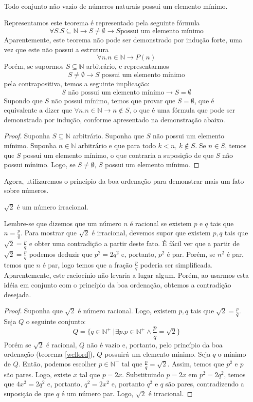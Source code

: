 \begin{Theorem}\label{wellord}
Todo conjunto não vazio de números naturais possui um elemento mínimo.
\end{Theorem}
Representamos este teorema é representado pela seguinte fórmula
\[
\forall S. S\subseteq \mathbb{N} \to S \neq \emptyset \to S\text{
  possui um elemento mínimo}
\]
Aparentemente, este teorema não pode ser demonstrado por indução
forte, uma vez que este não possui a estrutura
\[
\forall n. n\in\mathbb{N} \to P(n)
\]
Porém, se supormos $S\subseteq \mathbb{N}$ arbitrário, e
representarmos
\[S \neq \emptyset \to S\text{ possui um elemento mínimo}\]
pela contrapositiva, temos a seguinte implicação:
\[S\text{ não possui um elemento mínimo} \to S = \emptyset\]
Supondo que $S$ não possui mínimo, temos que provar que $S =
\emptyset$, que é equivalente a dizer que $\forall n. n\in\mathbb{N}
\to n \not\in S$, o que é uma fórmula que pode ser demonstrada por
indução, conforme apresentado na demonstração abaixo.
\begin{proof}
Suponha $S\subseteq\mathbb{N}$ arbitrário. Suponha que $S$ não possui
um elemento mínimo. Suponha $n\in\mathbb{N}$ arbitrário e que para
todo $k < n$, $k \not\in S$. Se $n \in S$, temos que $S$ possui um
elemento mínimo, o que contraria a suposição de que $S$ não possui
mínimo. Logo, se $S \neq \emptyset$, $S$ possui um elemento mínimo.
\end{proof}
Agora, utilizaremos o princípio da boa ordenação para demonstrar mais
um fato sobre números.
\begin{Theorem}
$\sqrt{2}$ é um número irracional.
\end{Theorem}
Lembre-se que dizemos que um número $n$ é racional se existem $p$ e
$q$ tais que $n = \frac{p}{q}$. Para mostrar que $\sqrt{2}$ é
irracional, devemos supor que existem $p,q$ tais que $\sqrt{2} =
\frac{p}{q}$ e obter uma contradição a partir deste fato. É fácil ver
que a partir de $\sqrt{2} =\frac{p}{q}$ podemos deduzir que $p^2 =
2q^2$ e, portanto, $p^2$ é par. Porém, se $n^2$ é par, temos que $n$ é
par, logo temos que a fração $\frac{p}{q}$ poderia ser
simplificada. Aparentemente, este raciocínio não levaria a lugar
algum. Porém, ao usarmos esta idéia em conjunto com o princípio da boa
ordenação, obtemos a contradição desejada.
\begin{proof}
Suponha que $\sqrt{2}$ é número racional. Logo, existem $p,q$ tais que
$\sqrt{2}=\frac{p}{q}$.
Seja $Q$ o seguinte conjunto:
\[
Q =\{q\in\mathbb{N}^+\,|\,\exists p. p \in \mathbb{N}^+ \land
\frac{p}{q} = \sqrt{2}\}
\]
Porém se $\sqrt{2}$ é racional, $Q$ não é vazio e, portanto, pelo
princípio da boa ordenação (teorema \ref{wellord}), $Q$ possuirá um
elemento mínimo. Seja $q$ o mínimo de $Q$. Então, podemos escolher $p
\in\mathbb{N}^+$ tal que $\frac{p}{q} = \sqrt{2}$. Assim, temos que
$p^2$ e $p$ são pares. Logo, existe $x$ tal que $p = 2x$. Substituindo
$p = 2x$ em $p^2 = 2q^2$, temos que $4x^2 = 2q^2$ e, portanto, $q^2 =
2x^2$ e, portanto $q^2$ e $q$ são pares, contradizendo a suposição de
que $q$ é um número par. Logo, $\sqrt{2}$ é irracional.
\end{proof}

